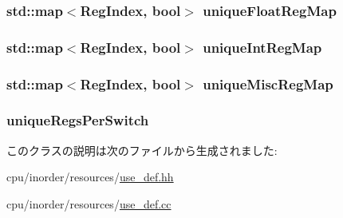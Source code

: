 \label{classUseDefUnit_ad4300fb3f2f2ddebbfd44bbcad133c56}
\hypertarget{classUseDefUnit_a148e8f7c874a196ab74ca1f39662c98c}{
\subsubsection[{uniqueFloatRegMap}]{\setlength{\rightskip}{0pt plus 5cm}std::map$<${\bf RegIndex}, bool$>$ {\bf uniqueFloatRegMap}}}
\label{classUseDefUnit_a148e8f7c874a196ab74ca1f39662c98c}
\hypertarget{classUseDefUnit_a007316fc06c43d3c786e79da6f3a5265}{
\subsubsection[{uniqueIntRegMap}]{\setlength{\rightskip}{0pt plus 5cm}std::map$<${\bf RegIndex}, bool$>$ {\bf uniqueIntRegMap}}}
\label{classUseDefUnit_a007316fc06c43d3c786e79da6f3a5265}
\hypertarget{classUseDefUnit_aeab2bd090cc9b29fbf5f386013dd79fd}{
\subsubsection[{uniqueMiscRegMap}]{\setlength{\rightskip}{0pt plus 5cm}std::map$<${\bf RegIndex}, bool$>$ {\bf uniqueMiscRegMap}}}
\label{classUseDefUnit_aeab2bd090cc9b29fbf5f386013dd79fd}
\hypertarget{classUseDefUnit_a796c1916448138c736618531476b9801}{
\subsubsection[{uniqueRegsPerSwitch}]{ {\bf uniqueRegsPerSwitch}}}
\label{classUseDefUnit_a796c1916448138c736618531476b9801}


このクラスの説明は次のファイルから生成されました:\begin{DoxyCompactItemize}
\item 
cpu/inorder/resources/\hyperlink{use__def_8hh}{use\_\-def.hh}\item 
cpu/inorder/resources/\hyperlink{use__def_8cc}{use\_\-def.cc}\end{DoxyCompactItemize}
